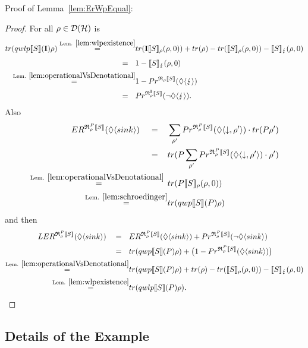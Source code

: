 \documentclass[a4paper,UKenglish,cleveref, autoref, thm-restate]{lipics-v2021}
\begin{document}
Proof of Lemma~\ref{lem:ErWpEqual}:
\begin{proof}
For all $\rho \in \mathcal{D}(\mathcal{H})$ is
    \begin{align*}
        tr(qwlp\llbracket S \rrbracket (\textbf{I}) \rho)\overset{\text{Lem. }\ref{lem:wlpexistence}}{=}& tr(\textbf{I}\llbracket S \rrbracket_{\rho}(\rho,0)) + tr(\rho)-tr(\llbracket S \rrbracket_{\rho}(\rho,0))- \llbracket S \rrbracket_{\lightning}(\rho,0)\\
        \overset{\phantom{Lem. 71}}{=}& 1 - \llbracket S \rrbracket_{\lightning}(\rho,0)\\
        \overset{\text{Lem. }\ref{lem:operationalVsDenotational}}{=}& 1-  Pr^{\mathfrak{R}_{\rho}\llbracket S \rrbracket}( \lozenge \langle \lightning \rangle)\\
        \overset{\phantom{Lem. 71}}{=}& Pr^{\mathfrak{R}_{\rho}^{\textbf{I}}\llbracket S \rrbracket}(\neg \lozenge \langle \lightning \rangle).
    \end{align*}
    Also
    \begin{align*}
        ER^{\mathfrak{R}_{\rho}^{P}\llbracket S \rrbracket} (\lozenge \langle sink \rangle) \overset{\phantom{Lem. 711}}{=}& \sum_{\rho'} Pr^{\mathfrak{R}_{\rho}^{P}\llbracket S \rrbracket}(\lozenge \langle \downarrow , \rho' \rangle)\cdot tr(P\rho') \\
        \overset{\phantom{Lem. 711}}{=}& tr(P \sum_{\rho'} Pr^{\mathfrak{R}_{\rho}^{P}\llbracket S \rrbracket}(\lozenge \langle \downarrow , \rho' \rangle)\cdot \rho')\\
        \overset{\text{Lem. }\ref{lem:operationalVsDenotational}\phantom{a}}{=} & tr(P \llbracket S \rrbracket_{\rho}(\rho,0))\\
        \overset{\text{Lem. }\ref{lem:schroedinger}}{=}& tr(qwp\llbracket S \rrbracket (P) \rho)
    \end{align*}
    and then
    \begin{align*}
        LER^{\mathfrak{R}_{\rho}^{P}\llbracket S \rrbracket} (\lozenge \langle sink \rangle) \overset{\phantom{Lem. 71}}{=}& ER^{\mathfrak{R}_{\rho}^{P}\llbracket S \rrbracket} (\lozenge \langle sink \rangle) + Pr^{\mathfrak{R}_{\rho}^{P}\llbracket S \rrbracket}(\neg \lozenge \langle sink \rangle)\\
        \overset{\phantom{Lem. 71}}{=}&  tr(qwp\llbracket S \rrbracket (P) \rho) + \bigl( 1- Pr^{\mathfrak{R}_{\rho}^{P}\llbracket S \rrbracket}( \lozenge \langle sink \rangle)\bigr)\\
        \overset{\text{Lem. }\ref{lem:operationalVsDenotational}}{=}& tr(qwp\llbracket S \rrbracket (P) \rho) + tr(\rho) - tr(\llbracket S \rrbracket_{\rho}(\rho,0)) - \llbracket S \rrbracket_{\lightning}(\rho,0)\\
        \overset{\text{Lem. }\ref{lem:wlpexistence}}{=}& tr(qwlp\llbracket S \rrbracket (P)\rho).
    \end{align*}
\end{proof}
\subsection{Details of the Example}
\label{app:ex}
\end{document}
